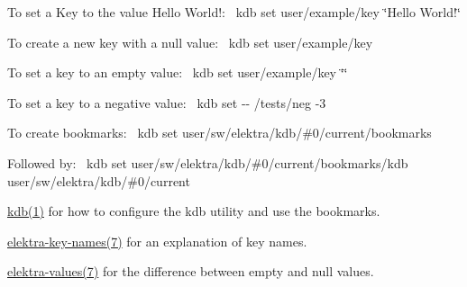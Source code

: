 To set a Key to the value {\ttfamily Hello World!}\+:~\newline
 {\ttfamily kdb set user/example/key \char`\"{}\+Hello World!\char`\"{}}

To create a new key with a null value\+:~\newline
 {\ttfamily kdb set user/example/key}

To set a key to an empty value\+:~\newline
 {\ttfamily kdb set user/example/key \char`\"{}\char`\"{}}

To set a key to a negative value\+:~\newline
 {\ttfamily kdb set -\/-\/ /tests/neg -\/3}

To create bookmarks\+:~\newline
 {\ttfamily kdb set user/sw/elektra/kdb/\#0/current/bookmarks}

Followed by\+:~\newline
 {\ttfamily kdb set user/sw/elektra/kdb/\#0/current/bookmarks/kdb user/sw/elektra/kdb/\#0/current}


\begin{DoxyItemize}
\item \hyperlink{doc_help_kdb_md}{kdb(1)} for how to configure the kdb utility and use the bookmarks.
\item \hyperlink{doc_help_elektra-key-names_md}{elektra-\/key-\/names(7)} for an explanation of key names.
\item \hyperlink{doc_help_elektra-values_md}{elektra-\/values(7)} for the difference between empty and null values. 
\end{DoxyItemize}